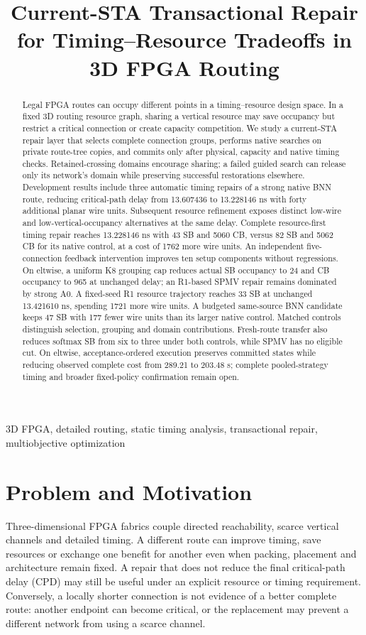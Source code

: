 \documentclass[conference,10pt]{IEEEtran}
\title{Current-STA Transactional Repair for Timing--Resource Tradeoffs in 3D FPGA Routing}
\author{\IEEEauthorblockN{Anonymous development manuscript}}
\begin{document}
\maketitle
\begin{abstract}
Legal FPGA routes can occupy different points in a timing--resource design space. In a fixed 3D routing resource graph, sharing a vertical resource may save occupancy but restrict a critical connection or create capacity competition. We study a current-STA repair layer that selects complete connection groups, performs native searches on private route-tree copies, and commits only after physical, capacity and native timing checks. Retained-crossing domains encourage sharing; a failed guided search can release only its network's domain while preserving successful restorations elsewhere. Development results include three automatic timing repairs of a strong native BNN route, reducing critical-path delay from 13.607436 to 13.228146 ns with forty additional planar wire units. Subsequent resource refinement exposes distinct low-wire and low-vertical-occupancy alternatives at the same delay. Complete resource-first timing repair reaches 13.228146 ns with 43 SB and 5060 CB, versus 82 SB and 5062 CB for its native control, at a cost of 1762 more wire units. An independent five-connection feedback intervention improves ten setup components without regressions. On eltwise, a uniform K8 grouping cap reduces actual SB occupancy to 24 and CB occupancy to 965 at unchanged delay; an R1-based SPMV repair remains dominated by strong A0. A fixed-seed R1 resource trajectory reaches 33 SB at unchanged 13.421610 ns, spending 1721 more wire units. A budgeted same-source BNN candidate keeps 47 SB with 177 fewer wire units than its larger native control. Matched controls distinguish selection, grouping and domain contributions. Fresh-route transfer also reduces softmax SB from six to three under both controls, while SPMV has no eligible cut. On eltwise, acceptance-ordered execution preserves committed states while reducing observed complete cost from 289.21 to 203.48 s; complete pooled-strategy timing and broader fixed-policy confirmation remain open.
\end{abstract}
\begin{IEEEkeywords}
3D FPGA, detailed routing, static timing analysis, transactional repair, multiobjective optimization
\end{IEEEkeywords}

\section{Problem and Motivation}
Three-dimensional FPGA fabrics couple directed reachability, scarce vertical channels and detailed timing. A different route can improve timing, save resources or exchange one benefit for another even when packing, placement and architecture remain fixed. A repair that does not reduce the final critical-path delay (CPD) may still be useful under an explicit resource or timing requirement. Conversely, a locally shorter connection is not evidence of a better complete route: another endpoint can become critical, or the replacement may prevent a different network from using a scarce channel.
\end{document}
